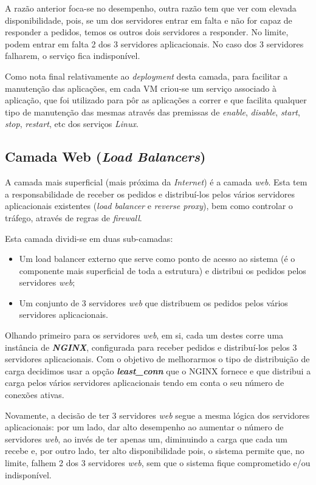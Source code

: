 A razão anterior foca-se no desempenho, outra razão tem que ver com elevada disponibilidade, pois, se um dos servidores entrar em falta e não for capaz de responder a pedidos, temos os outros dois servidores a responder. No limite, podem entrar em falta 2 dos 3 servidores aplicacionais. No caso dos 3 servidores falharem, o serviço fica indisponível.

Como nota final relativamente ao \textit{deployment} desta camada, para facilitar a manutenção das aplicações, em cada VM criou-se um serviço associado à aplicação, que foi utilizado para pôr as aplicações a correr e que facilita qualquer tipo de manutenção das mesmas através das premissas de \textit{enable}, \textit{disable}, \textit{start}, \textit{stop}, \textit{restart}, etc dos serviços \textit{Linux}. 

\subsection{Camada Web (\textit{Load Balancers})}
A camada mais superficial (mais próxima da \textit{Internet}) é a camada \textit{web}. Esta tem a responsabilidade de receber os pedidos e distribuí-los pelos vários servidores aplicacionais existentes (\textit{load balancer} e \textit{reverse proxy}), bem como controlar o tráfego, através de regras de \textit{firewall}.

Esta camada dividi-se em duas sub-camadas:
\begin{itemize}
\item Um load balancer externo que serve como ponto de acesso ao sistema (é o componente mais superficial de toda a estrutura) e distribui os pedidos pelos servidores \textit{web};
\item Um conjunto de 3 servidores \textit{web} que distribuem os pedidos pelos vários servidores aplicacionais.
\end{itemize}

Olhando primeiro para os servidores \textit{web}, em si, cada um destes corre uma instância de \textbf{\textit{NGINX}}, configurada para receber pedidos e distribuí-los pelos 3 servidores aplicacionais. Com o objetivo de melhorarmos o tipo de distribuição de carga decidimos usar a opção \textbf{\textit{least\_conn}} que o NGINX fornece e que distribui a carga pelos vários servidores aplicacionais tendo em conta o seu número de conexões ativas.

Novamente, a decisão de ter 3 servidores \textit{web} segue a mesma lógica dos servidores aplicacionais: por um lado, dar alto desempenho ao aumentar o número de servidores \textit{web}, ao invés de ter apenas um, diminuindo a carga que cada um recebe e, por outro lado, ter alto disponibilidade pois, o sistema permite que, no limite, falhem 2 dos 3 servidores \textit{web}, sem que o sistema fique comprometido e/ou indisponível.

